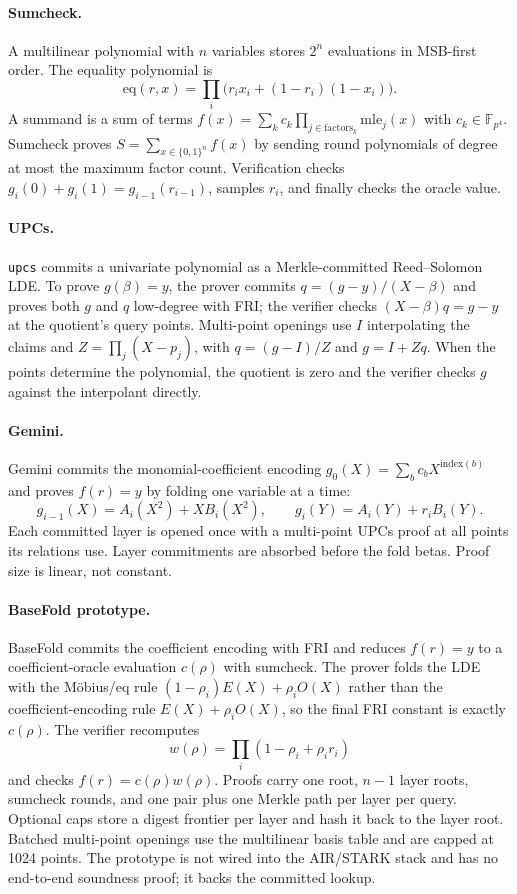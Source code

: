 \documentclass[11pt,a4paper]{article}
\newcommand{\wFpFour}{\mathbb{F}_{p^4}}
\newcommand{\wEq}{\mathrm{eq}}
\begin{document}
\paragraph{Sumcheck.} A multilinear polynomial with $n$ variables stores
$2^n$ evaluations in MSB-first order. The equality polynomial is
\[
\wEq(r,x)=\prod_i\bigl(r_ix_i+(1-r_i)(1-x_i)\bigr).
\]
A summand is a sum of terms
$f(x)=\sum_kc_k\prod_{j\in\mathrm{factors}_k}\mathrm{mle}_j(x)$ with
$c_k\in\wFpFour$. Sumcheck proves $S=\sum_{x\in\{0,1\}^n}f(x)$ by sending
round polynomials of degree at most the maximum factor count. Verification
checks $g_i(0)+g_i(1)=g_{i-1}(r_{i-1})$, samples $r_i$, and finally checks
the oracle value.

\paragraph{UPCs.} \texttt{upcs} commits a univariate polynomial as a
Merkle-committed Reed--Solomon LDE. To prove $g(\beta)=y$, the prover commits
$q=(g-y)/(X-\beta)$ and proves both $g$ and $q$ low-degree with FRI; the
verifier checks $(X-\beta)q=g-y$ at the quotient's query points. Multi-point
openings use $I$ interpolating the claims and $Z=\prod_j(X-p_j)$, with
$q=(g-I)/Z$ and $g=I+Zq$. When the points determine the polynomial, the
quotient is zero and the verifier checks $g$ against the interpolant directly.

\paragraph{Gemini.} Gemini commits the monomial-coefficient encoding
$g_0(X)=\sum_bc_bX^{\mathrm{index}(b)}$ and proves $f(r)=y$ by folding one
variable at a time:
\[
g_{i-1}(X)=A_i(X^2)+XB_i(X^2),\qquad
g_i(Y)=A_i(Y)+r_iB_i(Y).
\]
Each committed layer is opened once with a multi-point UPCs proof at all
points its relations use. Layer commitments are absorbed before the fold
betas. Proof size is linear, not constant.

\paragraph{BaseFold prototype.} BaseFold commits the coefficient encoding
with FRI and reduces $f(r)=y$ to a coefficient-oracle evaluation $c(\rho)$
with sumcheck. The prover folds the LDE with the M\"obius/eq rule
$(1-\rho_i)E(X)+\rho_iO(X)$ rather than the coefficient-encoding rule
$E(X)+\rho_iO(X)$, so the final FRI constant is exactly $c(\rho)$. The
verifier recomputes
\[
w(\rho)=\prod_i(1-\rho_i+\rho_ir_i)
\]
and checks $f(r)=c(\rho)w(\rho)$. Proofs carry one root, $n-1$ layer roots,
sumcheck rounds, and one pair plus one Merkle path per layer per query.
Optional caps store a digest frontier per layer and hash it back to the layer
root. Batched multi-point openings use the multilinear basis table and are
capped at 1024 points. The prototype is not wired into the AIR/STARK stack
and has no end-to-end soundness proof; it backs the committed lookup.
\end{document}
